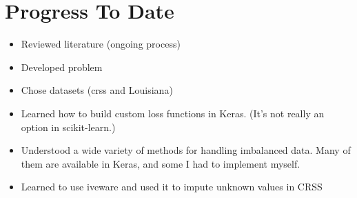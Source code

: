 \section{Progress To Date}

\begin{itemize}
	\item Reviewed literature (ongoing process)
	\item Developed problem
	\item Chose datasets (\acrfull{crss} \cite{CRSS} and Louisiana)
	\item Learned how to build custom loss functions in Keras.  (It's not really an option in scikit-learn.)
	\item Understood a wide variety of methods for handling imbalanced data.  Many of them are available in Keras, and some I had to implement myself.  
	\item Learned to use \acrfull{iveware} \cite{IVEware} and used it to impute unknown values in CRSS
\end{itemize}